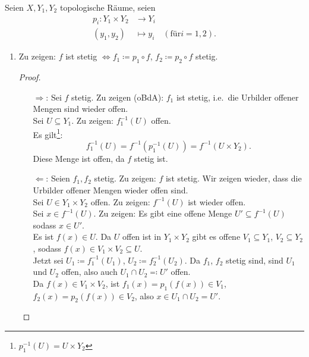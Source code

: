 \begin{problem*}[2]
  Seien \( X, Y_1, Y_2 \) topologische Räume, seien
  \begin{align*}
    p_i: Y_1 \times Y_2 &\to Y_i \\
    (y_1, y_2) &\mapsto y_i \quad (\text{für} i = 1,2)\text{.}
  \end{align*}
  \begin{enumerate}
    \item Zu zeigen: \( f \) ist stetig \( \Leftrightarrow f_1 \coloneqq p_1 \circ f \), \( f_2 \coloneqq p_2 \circ f \) stetig. \\
    \begin{proof}
      \ 
      \begin{itemize}
        \item[\( \Rightarrow \):] Sei \( f \) stetig. Zu zeigen (oBdA): \( f_1 \) ist stetig, i.e.\ die Urbilder offener Mengen sind wieder offen. \\
        Sei \( U \subseteq Y_1 \). Zu zeigen: \( f_1^{-1}(U) \) offen. \\
        Es gilt\footnote{\( p_1^{-1}(U) = U \times Y_2 \)}:
        \begin{equation*}
          f_1^{-1}(U) = f^{-1}(p_1^{-1}(U)) = f^{-1}(U \times Y_2)\text{.}
        \end{equation*}
        Diese Menge ist offen, da \( f \) stetig ist.
        \item[\( \Leftarrow \):] Seien \( f_1, f_2 \) stetig. Zu zeigen: \( f \) ist stetig. Wir zeigen wieder, dass die Urbilder offener Mengen wieder offen sind. \\
        Sei \( U \in Y_1 \times Y_2 \) offen. Zu zeigen: \( f^{-1}(U) \) ist wieder offen. \\
        Sei \( x \in f^{-1}(U) \). Zu zeigen: Es gibt eine offene Menge \( U' \subseteq f^{-1}(U) \) sodass \( x \in U' \). \\
        Es ist \( f(x) \in U \). Da \( U \) offen ist in \( Y_1 \times Y_2 \) gibt es offene \( V_1 \subseteq Y_1 \), \( V_2 \subseteq Y_2 \), sodass \( f( x) \in V_1 \times V_2 \subseteq U \). \\
        Jetzt sei \( U_1 \coloneqq f_1^{-1}(U_1) \), \( U_2 \coloneqq f_2^{-1}(U_2) \). Da \( f_1 \), \( f_2 \) stetig sind, sind \( U_1 \) und \( U_2 \) offen, also auch \( U_1 \cap U_2 \eqqcolon U' \) offen. \\
        Da \( f( x) \in V_1 \times V_2 \), ist \( f_1( x) = p_1(f(x)) \in V_1 \), \( f_2(x) = p_2(f(x)) \in V_2 \), also \( x \in U_1 \cap U_2 = U' \).
      \end{itemize}
    \end{proof}
    

\end{enumerate}
\end{problem*}
